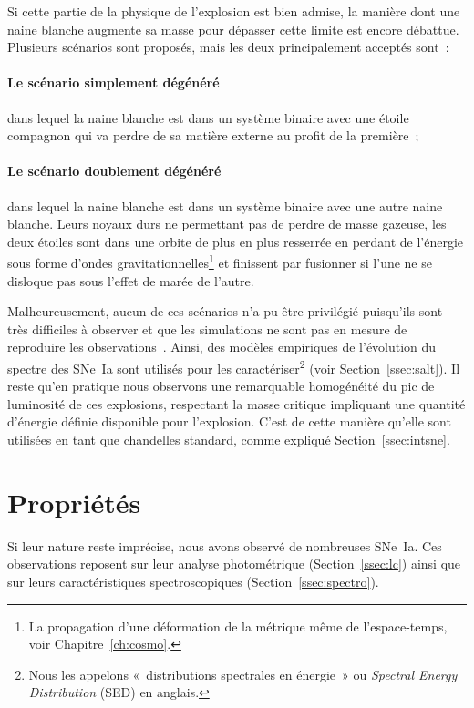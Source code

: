 \documentclass[../main/main.tex]{subfiles}
\begin{document}
Si cette partie de la physique de l'explosion est bien admise, la manière dont
une naine blanche augmente sa masse pour dépasser cette limite est encore
débattue. Plusieurs scénarios sont proposés, mais les deux principalement
acceptés sont~:
\paragraph*{Le scénario simplement dégénéré\!\!} \citep{whelan1973} dans lequel la
naine blanche est dans un système binaire avec une étoile compagnon qui va
perdre de sa matière externe au profit de la première~;
\paragraph*{Le scénario doublement dégénéré\!\!} \citep{webbink1984} dans lequel
la naine blanche est dans un système binaire avec une autre naine blanche. Leurs
noyaux durs ne permettant pas de perdre de masse gazeuse, les deux étoiles sont
dans une orbite de plus en plus resserrée en perdant de l'énergie sous forme
d'ondes gravitationnelles\footnote{La propagation d'une déformation de la
métrique même de l'espace-temps, voir Chapitre~\ref{ch:cosmo}.} et finissent par
fusionner si l'une ne se disloque pas sous l'effet de marée de l'autre.

Malheureusement, aucun de ces scénarios n'a pu être privilégié puisqu'ils sont
très difficiles à observer et que les simulations ne sont pas en mesure de
reproduire les observations~\citep{ropke2012}. Ainsi, des modèles empiriques de
l'évolution du spectre des SNe~Ia sont utilisés pour les
caractériser\footnote{Nous les appelons «~distributions spectrales en énergie~»
ou \textit{Spectral Energy Distribution} (SED) en anglais.} (voir
Section~\ref{ssec:salt}). Il reste qu'en pratique nous observons une remarquable
homogénéité du pic de luminosité de ces explosions, respectant la masse critique
impliquant une quantité d'énergie définie disponible pour l'explosion. C'est de
cette manière qu'elle sont utilisées en tant que chandelles standard, comme
expliqué Section~\ref{ssec:intsne}.

\section{Propriétés}\label{sec:sneprop}

Si leur nature reste imprécise, nous avons observé de nombreuses SNe~Ia. Ces
observations reposent sur leur analyse photométrique (Section~\ref{ssec:lc})
ainsi que sur leurs caractéristiques spectroscopiques
(Section~\ref{ssec:spectro}).
\end{document}
